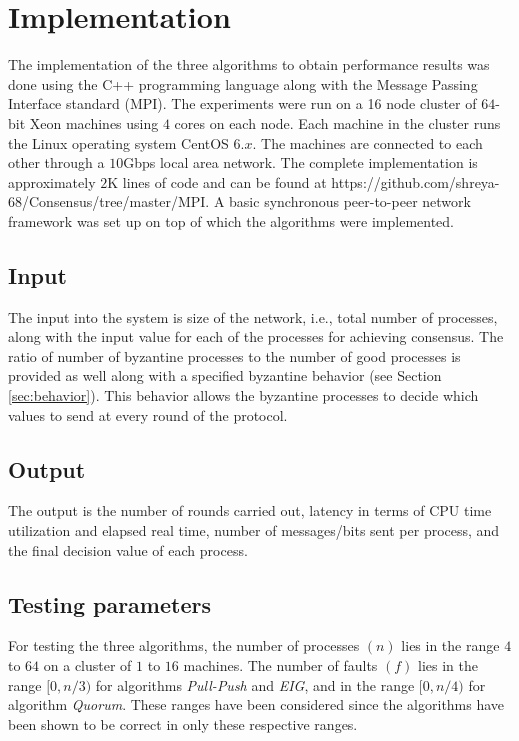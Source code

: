 ﻿\section{Implementation}
\label{sec:eval}

The implementation of the three algorithms to obtain performance results
was done using the C++ programming language along with the Message
Passing Interface standard (MPI).  The experiments were run on a 16 node
cluster of $64$-bit Xeon machines using $4$ cores on each node.
Each machine in the cluster runs the Linux operating system CentOS $6.x$.
The machines are connected to each other through a $10$Gbps local area
network. The complete implementation is approximately $2$K lines of code
and can be found at
https://github.com/shreya-68/Consensus/tree/master/MPI. A basic
synchronous peer-to-peer network framework was set up on top of which
the algorithms were implemented.

\subsection{Input}
The input into the system is size of the network, i.e., total number of processes, along with the input value for each of the processes for achieving consensus. The ratio of number of byzantine processes to the number of good processes is provided as well along with a specified byzantine behavior (see Section \ref{sec:behavior}). This behavior allows the byzantine processes to decide which values to send at every round of the protocol. 

\subsection{Output}
The output is the number of rounds carried out, latency in terms of CPU time utilization and elapsed real time, number of messages/bits sent per process, and the final decision value of each process. 

\subsection{Testing parameters}
For testing the three algorithms, the number of processes $(n)$ lies in the range $4$ to $64$ on a cluster of $1$ to $16$ machines. The number of faults $(f)$ lies in the range $[0, n/3)$ for algorithms \textit{Pull-Push} and \textit{EIG}, and in the range $[0, n/4)$ for algorithm \textit{Quorum}. These ranges have been considered since the algorithms have been shown to be correct in only these respective ranges.

